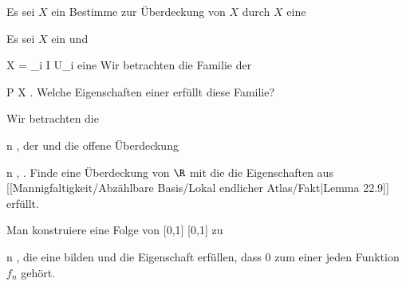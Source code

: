 {}
{

Es sei $X$ ein
Bestimme zur Überdeckung von $X$ durch $X$ eine

}
{} {}

{}
{

Es sei $X$ ein
und

\mavergleichskette
{\vergleichskette
{ X
}
{ = }{ \bigcup_{i \in I} U_i
}
{  }{
}
{    }{
}
{   }{
}
}
{}{}{}
eine
Wir betrachten die Familie der

 {}
 {P \in X} {}
 {} {} {} {.}
Welche Eigenschaften einer
 {} {}
erfüllt diese Familie?

}
{} {}

{}
{

Wir betrachten die

 {}
 {n \in \N} {}
 {} {} {} {,} der
und die offene Überdeckung

 {}
 {n \in \N} {}
 {} {} {} {,}
 {} {.}
Finde eine Überdeckung von $\R$ mit
die die Eigenschaften
aus [[Mannigfaltigkeit/Abzählbare Basis/Lokal endlicher Atlas/Fakt|Lemma 22.9]]
 {} {} erfüllt.

}
{} {}

{}
{

Man konstruiere eine Folge von
 { [0,1] } { [0,1]
} {}
zu

\mavergleichskette
{\vergleichskette
{ n
}
{ \in }{ \N
}
{  }{
}
{    }{
}
{   }{
}
}
{}{}{,}
die eine
bilden und die Eigenschaft erfüllen, dass $0$ zum
einer jeden Funktion $f_n$ gehört.

}
{} {}

